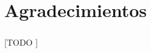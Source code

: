 \documentclass{subfiles}
\begin{document}
  \chapter*{Agradecimientos}
  \label{sec:acknowledgements}


    \paragraph{}
    [TODO ]
\end{document}
